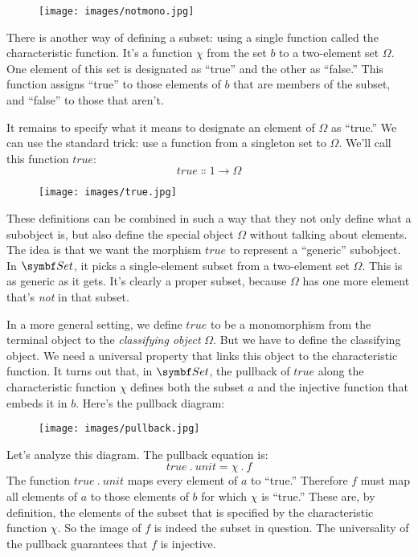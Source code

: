 \begin{figure}[H]
\centering
\texttt{[image: images/notmono.jpg]}
\end{figure}

\noindent
There is another way of defining a subset: using a single function
called the characteristic function. It's a function $\chi$ from the
set $b$ to a two-element set $\Omega$. One element of this set
is designated as ``true'' and the other as ``false.'' This function
assigns ``true'' to those elements of $b$ that are members of the
subset, and ``false'' to those that aren't.

It remains to specify what it means to designate an element of
$\Omega$ as ``true.'' We can use the standard trick: use a function
from a singleton set to $\Omega$. We'll call this function
$true$:
\[true \Colon 1 \to \Omega\]

\begin{figure}[H]
\centering
\texttt{[image: images/true.jpg]}
\end{figure}

\noindent
These definitions can be combined in such a way that they not only
define what a subobject is, but also define the special object
$\Omega$ without talking about elements. The idea is that we want the
morphism $true$ to represent a ``generic'' subobject. In
$\Set$, it picks a single-element subset from a two-element set
$\Omega$. This is as generic as it gets. It's clearly a proper subset,
because $\Omega$ has one more element that's \emph{not} in that
subset.

In a more general setting, we define $true$ to be a monomorphism
from the terminal object to the \emph{classifying object} $\Omega$.
But we have to define the classifying object. We need a universal
property that links this object to the characteristic function. It turns
out that, in $\Set$, the pullback of $true$ along the
characteristic function $\chi$ defines both the subset $a$
and the injective function that embeds it in $b$. Here's the
pullback diagram:

\begin{figure}[H]
\centering
\texttt{[image: images/pullback.jpg]}
\end{figure}

\noindent
Let's analyze this diagram. The pullback equation is:
\[true\ .\ unit = \chi\ .\ f\]
The function $true\ .\ unit$ maps every element of $a$ to
``true.'' Therefore $f$ must map all elements of $a$ to
those elements of $b$ for which $\chi$ is ``true.'' These
are, by definition, the elements of the subset that is specified by the
characteristic function $\chi$. So the image of $f$ is indeed
the subset in question. The universality of the pullback guarantees that
$f$ is injective.

